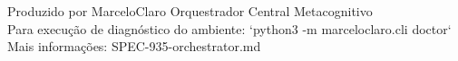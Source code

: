 \documentclass[12pt,a4paper]{article}
\begin{document}


\vfill
\begin{center}
    {\small Produzido por MarceloClaro Orquestrador Central Metacognitivo \\ Para execução de diagnóstico do ambiente: `python3 -m marceloclaro.cli doctor` \\ Mais informações: SPEC-935-orchestrator.md}
\end{center}
\end{document}
